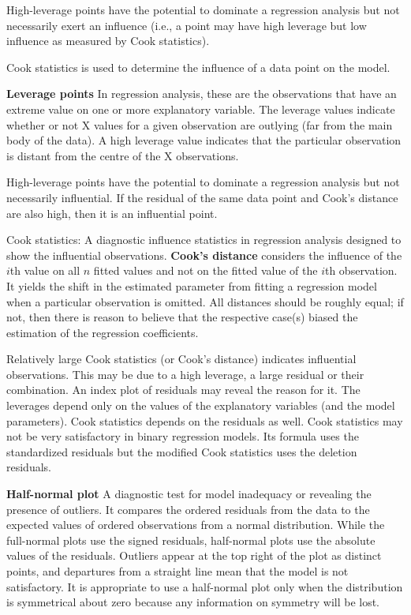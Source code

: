 High-leverage points have the potential to dominate a regression analysis but not necessarily exert an influence (i.e., a point may have high leverage but low influence as measured by Cook statistics).

Cook statistics is used to determine the influence of a data point on the model.

\textbf{Leverage points} In regression analysis, these are the observations that have an extreme value on one or more explanatory variable. The leverage values indicate whether or not X values for a given observation are outlying (far from the main body of the data). A high leverage value indicates that the particular observation is distant from the centre of the X observations.

High-leverage points have the potential to dominate a regression analysis but not necessarily influential. If the residual of the same data point and Cook's distance are also high, then it is an influential point.




Cook statistics: A diagnostic influence statistics in regression analysis designed to show the influential observations.
\textbf{Cook's distance} considers the influence of the $i$th value on all $n$ fitted values and not on the fitted value of the $i$th observation. It yields the shift in the estimated parameter from fitting a regression model when a particular observation is omitted. All distances should be roughly equal; if not, then there is reason to believe that the respective case(s) biased the estimation of the regression coefficients.

Relatively large Cook statistics (or Cook's distance) indicates influential observations. This may be due to a high leverage, a large residual or their combination. An index plot of residuals may reveal the reason for it. The leverages depend only on the values of the explanatory variables (and the model parameters). Cook statistics depends on the residuals as well. Cook statistics may not be very satisfactory in binary regression models. Its formula uses the standardized residuals but the modified Cook statistics uses the deletion residuals.

\textbf{Half-normal plot} A diagnostic test for model inadequacy or revealing the presence of outliers. It compares the ordered residuals from the data to the expected values of ordered observations from a normal distribution. While the full-normal plots use the signed residuals, half-normal plots use the absolute values of the residuals. Outliers appear at the top right of the plot as distinct points, and departures from a straight line mean that the model is not satisfactory. It is appropriate to use a half-normal plot only when the distribution is symmetrical about zero because any information on symmetry will be lost.

